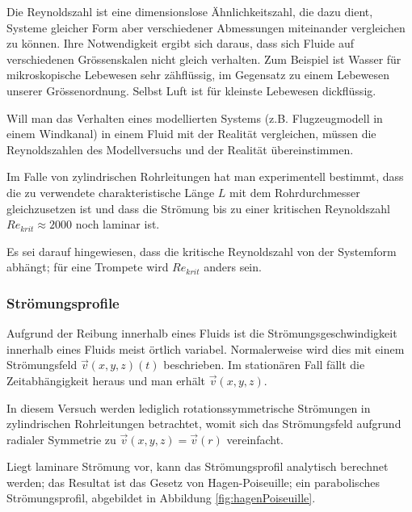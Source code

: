 Die Reynoldszahl  ist eine dimensionslose \"Ahnlichkeitszahl,  die dazu dient,
Systeme gleicher  Form aber verschiedener Abmessungen  miteinander vergleichen
zu  k\"onnen. Ihre Notwendigkeit  ergibt  sich daraus,  dass  sich Fluide  auf
verschiedenen Gr\"ossenskalen nicht gleich  verhalten. Zum Beispiel ist Wasser
f\"ur  mikroskopische Lebewesen  sehr  z\"ahfl\"ussig, im  Gegensatz zu  einem
Lebewesen unserer  Gr\"ossenordnung. Selbst Luft ist f\"ur  kleinste Lebewesen
dickfl\"ussig.

Will  man das  Verhalten  eines modellierten  Systems (z.B. Flugzeugmodell  in
einem Windkanal) in  einem Fluid mit der Realit\"at  vergleichen, m\"ussen die
Reynoldszahlen des Modellversuchs und der Realit\"at \"ubereinstimmen.

Im Falle von zylindrischen Rohrleitungen  hat man experimentell bestimmt, dass
die  zu  verwendete  charakteristische  L\"ange $L$  mit  dem  Rohrdurchmesser
gleichzusetzen  ist   und  dass  die   Str\"omung  bis  zu   einer  kritischen
Reynoldszahl $\mathit{Re}_{krit} \approx 2000$ noch laminar ist.

Es sei darauf hingewiesen, dass  die kritische Reynoldszahl von der Systemform
abh\"angt; f\"ur eine Trompete wird $\mathit{Re}_{krit}$ anders sein.


\subsubsection{Str\"omungsprofile}
\label{subsubsec:stromungsprofile}

Aufgrund der Reibung innerhalb eines Fluids ist die Str\"omungsgeschwindigkeit
innerhalb eines  Fluids meist \"ortlich variabel. Normalerweise  wird dies mit
einem Str\"omungsfeld  $\vec{v}(x,y,z)(t)$ beschrieben. Im  station\"aren Fall
f\"allt die Zeitabh\"angigkeit heraus und man erh\"alt $\vec{v}(x,y,z)$.

In  diesem  Versuch  werden lediglich  rotationssymmetrische  Str\"omungen  in
zylindrischen  Rohrleitungen   betrachtet,  womit  sich   das  Str\"omungsfeld
aufgrund radialer Symmetrie zu $\vec{v}(x,y,z) = \vec{v}(r)$ vereinfacht.

Liegt laminare Str\"omung vor, kann das Str\"omungsprofil analytisch berechnet
werden; das  Resultat ist das  Gesetz von Hagen-Poiseuille;  ein parabolisches
Str\"omungsprofil, abgebildet in Abbildung \ref{fig:hagenPoiseuille}.

